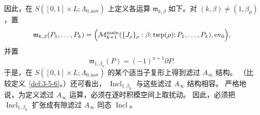 因此，在
$S([0,1]\times L;\Lambda_{0,\mathrm{nov}})$ 上定义各运算
$\mathfrak m_{k,\beta}$
如下。对
$(k,\beta)\ne(1,\beta_0)$，置
\[
 \mathfrak m_{k,\beta}(P_1,\ldots,P_k)
 =\Bigl(
 \mathcal M_{k+1}^{\mathrm{main}}
 (\{J_\rho\}_\rho:\beta;\operatorname{twp}(\rho);
 P_1,\ldots,P_k),\operatorname{ev}_0\Bigr),
\]
并置
\[
 \mathfrak m_{1,\beta_0}(P)=(-1)^{n+1}\partial P.
\]
于是，在
$S([0,1]\times L;\Lambda_{0,\mathrm{nov}})$
的某个适当子复形上得到滤过 $A_\infty$ 结构。
（比较定义~\ref{def:3-5-6}。）还可看出，
$\operatorname{Incl}_{1,\beta_0}$ 与这些滤过 $A_\infty$ 结构相容。
严格地说，为定义滤过 $A_\infty$ 运算，必须在逐时积模空间上取扰动。
因此，必须把 $\operatorname{Incl}_{1,\beta_0}$
扩张成有隙滤过 $A_\infty$ 同态 $\operatorname{Incl}$。
